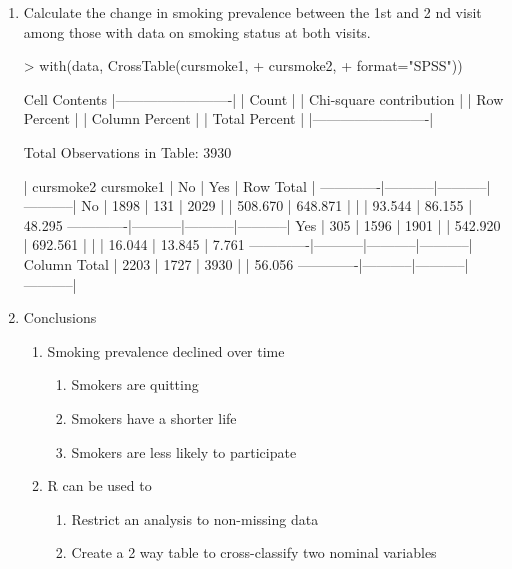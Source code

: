 \documentclass{article}
\begin{document}
\begin{enumerate}
\begin{enumerate}
\end{enumerate}
\pagebreak
\item Calculate the change in smoking prevalence between the 1st and 2 nd visit among  those with data on smoking status at both visits.
\begin{Schunk}
\begin{Sinput}
> with(data, CrossTable(cursmoke1, 
+                       cursmoke2, 
+                       format="SPSS"))
\end{Sinput}
\begin{Soutput}
   Cell Contents
|-------------------------|
|                   Count |
| Chi-square contribution |
|             Row Percent |
|          Column Percent |
|           Total Percent |
|-------------------------|

Total Observations in Table:  3930 

             | cursmoke2 
   cursmoke1 |       No  |      Yes  | Row Total | 
-------------|-----------|-----------|-----------|
          No |     1898  |      131  |     2029  | 
             |  508.670  |  648.871  |           | 
             |   93.544% |    6.456% |   51.628% | 
             |   86.155% |    7.585% |           | 
             |   48.295% |    3.333% |           | 
-------------|-----------|-----------|-----------|
         Yes |      305  |     1596  |     1901  | 
             |  542.920  |  692.561  |           | 
             |   16.044% |   83.956% |   48.372% | 
             |   13.845% |   92.415% |           | 
             |    7.761% |   40.611% |           | 
-------------|-----------|-----------|-----------|
Column Total |     2203  |     1727  |     3930  | 
             |   56.056% |   43.944% |           | 
-------------|-----------|-----------|-----------|
\end{Soutput}
\end{Schunk}
\item Conclusions
\begin{enumerate}
  \item Smoking prevalence declined over time
  \begin{enumerate}
  \item Smokers are quitting
  \item Smokers have a shorter life
  \item Smokers are less likely to participate
\end{enumerate}
\item R can be used to
\begin{enumerate}
  \item Restrict an analysis to non-missing data
  \item Create a 2 way table to cross-classify two nominal variables
\end{enumerate}

\end{enumerate}

\end{enumerate}
\pagebreak
\end{document}
